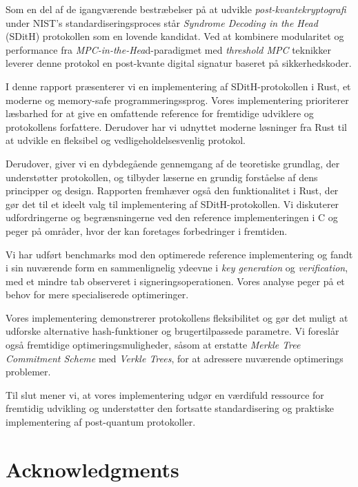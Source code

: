 \documentclass[11pt]{report}
\theoremstyle{definition}
\theoremstyle{plain}
\begin{document}
Som en del af de igangværende bestræbelser på at udvikle \textit{post-kvantekryptografi} under NIST's standardiseringsproces står \textit{Syndrome Decoding in the Head} (SDitH) protokollen som en lovende kandidat. Ved at kombinere modularitet og performance fra \textit{MPC-in-the-Hea}d-paradigmet med \textit{threshold MPC} teknikker leverer denne protokol en post-kvante digital signatur baseret på sikkerhedskoder.

I denne rapport præsenterer vi en implementering af SDitH-protokollen i Rust, et moderne og memory-safe programmeringssprog. Vores implementering prioriterer læsbarhed for at give en omfattende reference for fremtidige udviklere og protokollens forfattere. Derudover har vi udnyttet moderne løsninger fra Rust til at udvikle en fleksibel og vedligeholdelsesvenlig protokol.

Derudover, giver vi en dybdegående gennemgang af de teoretiske grundlag, der understøtter protokollen, og tilbyder læserne en grundig forståelse af dens principper og design. Rapporten fremhæver også den funktionalitet i Rust, der gør det til et ideelt valg til implementering af SDitH-protokollen. Vi diskuterer udfordringerne og begrænsningerne ved den reference implementeringen i C og peger på områder, hvor der kan foretages forbedringer i fremtiden.

Vi har udført benchmarks mod den optimerede reference implementering og fandt i sin nuværende form en sammenlignelig ydeevne i \textit{key generation} og \textit{verification}, med et mindre tab observeret i signeringsoperationen. Vores analyse peger på et behov for mere specialiserede optimeringer.

Vores implementering demonstrerer protokollens fleksibilitet og gør det muligt at udforske alternative hash-funktioner og brugertilpassede parametre. Vi foreslår også fremtidige optimeringsmuligheder, såsom at erstatte \textit{Merkle Tree Commitment Scheme} med \textit{Verkle Trees}, for at adressere nuværende optimerings problemer.

Til slut mener vi, at vores implementering udgør en værdifuld ressource for fremtidig udvikling og understøtter den fortsatte standardisering og praktiske implementering af post-quantum protokoller.


\chapter*{Acknowledgments}
\end{document}
